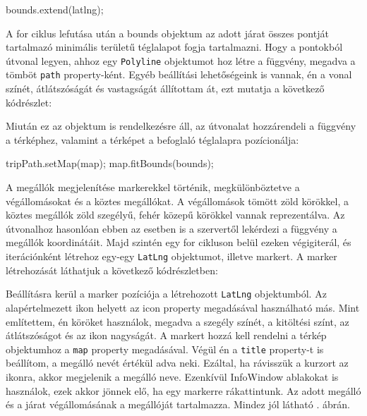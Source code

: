 \begin{cpp}
bounds.extend(latlng);
\end{cpp}

A for ciklus lefutása után a bounds objektum az adott járat összes pontját tartalmazó minimális területű téglalapot fogja tartalmazni.
Hogy a pontokból útvonal legyen, ahhoz egy \texttt{Polyline} objektumot hoz létre a függvény, megadva a tömböt \texttt{path} property-ként. Egyéb beállítási lehetőségeink is vannak, én a vonal színét, átlátszóságát és vastagságát állítottam át, ezt mutatja a következő kódrészlet:


Miután ez az objektum is rendelkezésre áll, az útvonalat hozzárendeli a függvény a térképhez, valamint a térképet a befoglaló téglalapra pozícionálja:

\begin{cpp}
tripPath.setMap(map);
map.fitBounds(bounds);
\end{cpp}

A megállók megjelenítése markerekkel történik, megkülönböztetve a végállomásokat és a köztes megállókat. A végállomások tömött zöld körökkel, a köztes megállók zöld szegélyű, fehér közepű körökkel vannak reprezentálva. Az útvonalhoz hasonlóan ebben az esetben is a szervertől lekérdezi a függvény a megállók koordinátáit. Majd szintén egy for cikluson belül ezeken végigiterál, és iterációnként létrehoz egy-egy \texttt{LatLng} objektumot, illetve markert. A marker létrehozását láthatjuk a következő kódrészletben:


Beállításra kerül a marker pozíciója a létrehozott \texttt{LatLng} objektumból. Az alapértelmezett ikon helyett az icon property megadásával használható más. Mint említettem, én köröket használok, megadva a szegély színét, a kitöltési színt, az átlátszóságot és az ikon nagyságát. A markert hozzá kell rendelni a térkép objektumhoz a \texttt{map} property megadásával. Végül én a \texttt{title} property-t is beállítom, a megálló nevét értékül adva neki. Ezáltal, ha rávisszük a kurzort az ikonra, akkor megjelenik a megálló neve. Ezenkívül InfoWindow ablakokat is használok, ezek akkor jönnek elő, ha egy markerre rákattintunk. Az adott megálló és a járat végállomásának a megállóját tartalmazza. Mindez jól látható . ábrán.

